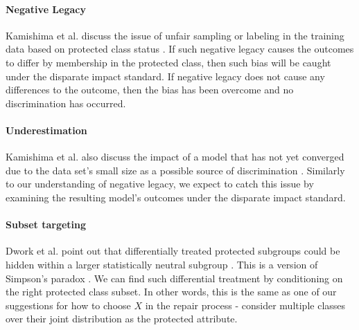 \paragraph{Negative Legacy}  Kamishima et al. discuss the issue of unfair sampling or labeling in the training data based on protected class status \cite{Kamishima12Fairness}.  If such negative legacy causes the outcomes to differ by membership in the protected class, then such bias will be caught under the disparate impact standard.  If negative legacy does not cause any differences to the outcome, then the bias has been overcome and no discrimination has occurred. 

\paragraph{Underestimation}  Kamishima et al. also discuss the impact of a model that has not yet converged due to the data set's small size as a possible source of discrimination \cite{Kamishima12Fairness}.  Similarly to our understanding of negative legacy, we expect to catch this issue by examining the resulting model's outcomes under the disparate impact standard.

\paragraph{Subset targeting}  Dwork et al. point out that differentially treated protected subgroups could be hidden within a larger statistically neutral subgroup \cite{Dwork12Fairness}.  This is a version of Simpson's paradox \cite{Pearl14Simpson}.  We can find such differential treatment by conditioning on the right protected class subset.  In other words, this is the same as one of our suggestions for how to choose $X$ in the repair process - consider multiple classes over their joint distribution as the protected attribute.
